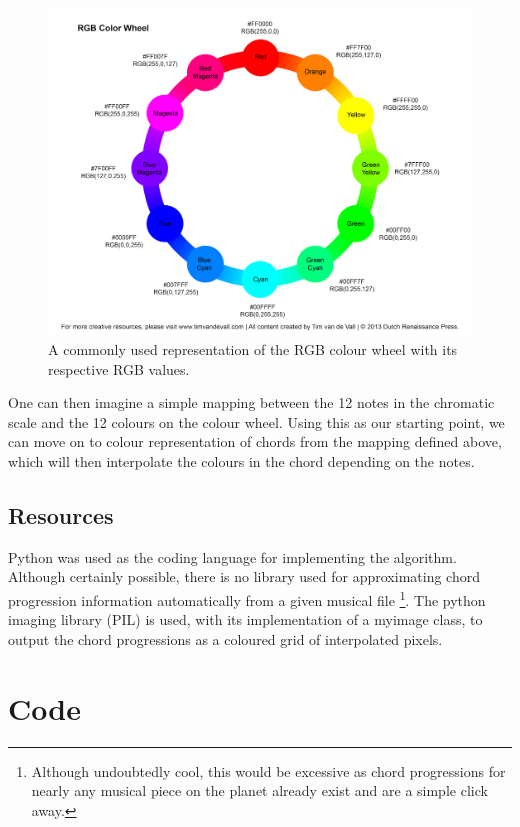 \documentclass{article}
\begin{document}
\begin{figure}
    \includegraphics[scale=0.3]{wheel.png}
    \caption{A commonly used representation of the RGB colour wheel with its respective RGB values.}
    \label{fig:wheel}
    \centering
\end{figure}

One can then imagine a simple mapping between the 12 notes in the chromatic scale and the 12 colours on the colour wheel. Using this as our starting point, we can move on to colour representation of chords from the mapping defined above, which will then interpolate the colours in the chord depending on the notes.

\subsection{Resources}

Python was used as the coding language for implementing the algorithm. Although certainly possible, there is no library used for approximating chord progression information automatically from a given musical file \footnote{Although undoubtedly cool, this would be excessive as chord progressions for nearly any musical piece on the planet already exist and are a simple click away.}. The python imaging library (PIL) is used, with its implementation of a myimage class, to output the chord progressions as a coloured grid of interpolated pixels.

\section{Code}
\end{document}
